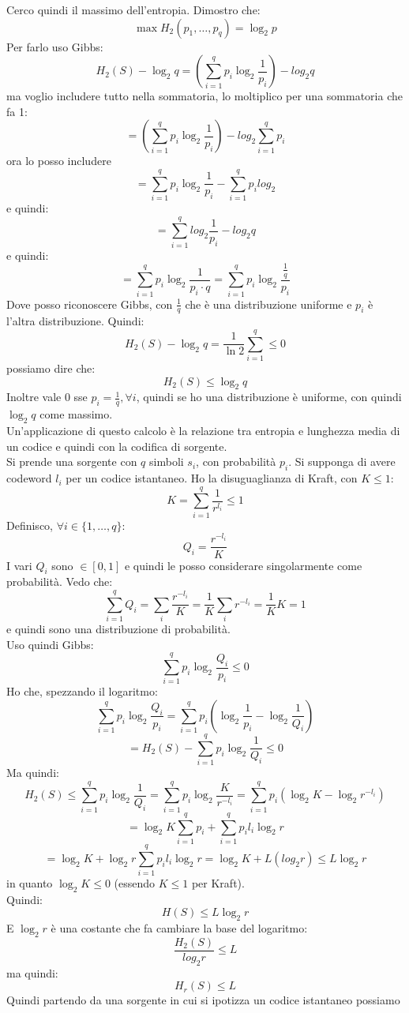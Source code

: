 \documentclass[a4paper,12pt, oneside]{book}
\begin{document}
Cerco quindi il massimo dell'entropia. Dimostro che:
\[\max H_2(p_1,\ldots, p_q)=\log_2 p\]
Per farlo uso Gibbs:
\[H_2(S)-\log_2 q=\left(\sum_{i=1}^q p_i\log_2\frac{1}{p_i}\right)-log_2 q\]
ma voglio includere tutto nella sommatoria, lo moltiplico per una sommatoria che
fa 1:
\[=\left(\sum_{i=1}^q p_i\log_2\frac{1}{p_i}\right)-log_2 \sum_{i=1}^qp_i\]
ora lo posso includere
\[=\sum_{i=1}^q p_i\log_2\frac{1}{p_i}- \sum_{i=1}^qp_i log_2\]
e quindi:
\[=\sum_{i=1}^qlog_2\frac{1}{p_i}-log_2 q\]
e quindi:
\[=\sum_{i=1}^q p_i\log_2\frac{1}{p_i\cdot q}=\sum_{i=1}^q
  p_i\log_2\frac{\frac{1}{q}}{p_i}\]
Dove posso riconoscere Gibbs, con $\frac{1}{q}$ che è una distribuzione
uniforme e $p_i$ è l'altra distribuzione. Quindi:
\[H_2(S)-\log_2 q=\frac{1}{\ln 2}\sum_{i=1}^q\leq 0\]
possiamo dire che:
\[H_2(S)\leq \log_2 q\]
Inoltre vale 0 sse $p_i=\frac{1}{q},\forall i$, quindi se ho una distribuzione è
uniforme, con quindi $\log_2 q$ come massimo.\\
Un'applicazione di questo calcolo è la relazione tra entropia e lunghezza media
di un codice e quindi con la codifica di sorgente.\\
Si prende una sorgente con $q$ simboli $s_i$, con probabilità $p_i$. Si supponga
di avere codeword $l_i$ per un codice istantaneo. Ho la disuguaglianza di Kraft,
con $K\leq 1$:
\[K=\sum_{i=1}^q\frac{1}{r^{l_i}}\leq 1\]
Definisco, $\forall i\in\{1,\ldots, q\}$:
\[Q_i=\frac{r^{-l_i}}{K}\]
I vari $Q_i$ sono $\in[0,1]$ e quindi le posso considerare singolarmente come
probabilità. Vedo che:
\[\sum_{i=1}^q Q_i=\sum_i \frac{r^{-l_i}}{K} = \frac{1}{K}\sum_i
  r^{-l_i}=\frac{1}{K}K =1\]
e quindi sono una distribuzione di probabilità.\\
Uso quindi Gibbs:
\[\sum_{i=1}^q p_i\log_2\frac{Q_i}{p_i}\leq 0\]
Ho che, spezzando il logaritmo:
\[\sum_{i=1}^q p_i\log_2\frac{Q_i}{p_i}=\sum_{i=1}^qp_i\left(
  \log_2\frac{1}{p_i}-\log_2\frac{1}{Q_i}\right)\]
\[=H_2(S)-\sum_{i=1}^qp_i\log_2\frac{1}{Q_i}\leq 0\]
Ma quindi:
\[H_2(S)\leq  \sum_{i=1}^qp_i\log_2\frac{1}{Q_i}=\sum_{i=1}^qp_i\log_2
  \frac{K}{r^{-l_i}}=\sum_{i=1}^qp_i\left(\log_2K - \log_2 r^{-l_i}\right)\]
\[=\log_2 K\sum_{i=1}^qp_i+\sum_{i=1}^qp_i l_i\log_2 r\]
\[
  =\log_2 K+\log_2 r\sum_{i=1}^qp_i l_i\log_2 r=\log_2 K+L(log_2 r)\leq L\log_2
  r\]
in quanto $\log_2 K\leq 0$ (essendo $K\leq 1$ per Kraft).\\
Quindi:
\[H(S)\leq L\log_2 r\]
E $\log_2 r$ è una costante che fa cambiare la base del logaritmo:
\[\frac{H_2(S)}{log_2 r}\leq L\]
ma quindi:
\[H_r(S)\leq L\]
Quindi partendo da una sorgente in cui si ipotizza un codice istantaneo possiamo
\end{document}
